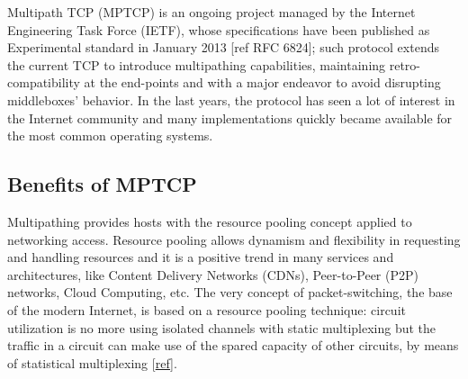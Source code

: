 Multipath TCP (MPTCP) is an ongoing project managed by the Internet Engineering Task Force (IETF), whose specifications have been published as Experimental standard in January 2013 [ref RFC 6824]; such protocol extends the current TCP to introduce multipathing capabilities, maintaining retro-compatibility at the end-points and with a major endeavor to avoid disrupting middleboxes' behavior. In the last years, the protocol has seen a lot of interest in the Internet community and many implementations quickly became available for the most common operating systems.

\subsection{Benefits of MPTCP}
Multipathing provides hosts with the resource pooling concept applied to networking access. Resource pooling allows dynamism and flexibility in requesting and handling resources and it is a positive trend in many services and architectures, like Content Delivery Networks (CDNs), Peer-to-Peer (P2P) networks, Cloud Computing, etc. The very concept of packet-switching, the base of the modern Internet, is based on a resource pooling technique: circuit utilization is no more using isolated channels with static multiplexing but the traffic in a circuit can make use of the spared capacity of other circuits, by means of statistical multiplexing [\href{https://www.cl.cam.ac.uk/~as2330/docs/multipath-survey.pdf}{ref}].



